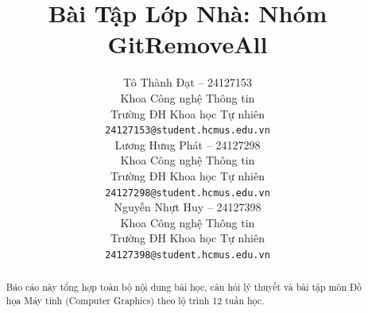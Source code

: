\documentclass{article} %
\title{Bài Tập Lớp Nhà: Nhóm GitRemoveAll}
\author{
  Tô Thành Đạt -- 24127153 \\
  Khoa Công nghệ Thông tin \\
  Trường ĐH Khoa học Tự nhiên \\
  \texttt{24127153@student.hcmus.edu.vn} \\
  \And
  Lương Hưng Phát -- 24127298 \\
  Khoa Công nghệ Thông tin \\
  Trường ĐH Khoa học Tự nhiên \\
  \texttt{24127298@student.hcmus.edu.vn} \\
  \And
  Nguyễn Nhựt Huy -- 24127398 \\
  Khoa Công nghệ Thông tin \\
  Trường ĐH Khoa học Tự nhiên \\
  \texttt{24127398@student.hcmus.edu.vn} \\
}
\begin{document}

\clearpage

\maketitle

\begin{abstract}
Báo cáo này tổng hợp toàn bộ nội dung bài học, câu hỏi lý thuyết và bài tập môn Đồ họa Máy tính (Computer Graphics) theo lộ trình 12 tuần học.
\end{abstract}

\tableofcontents
\newpage


\newpage

\newpage

\newpage

\newpage

\newpage

\newpage

\newpage

% 
% 
% 
% 



\end{document}
